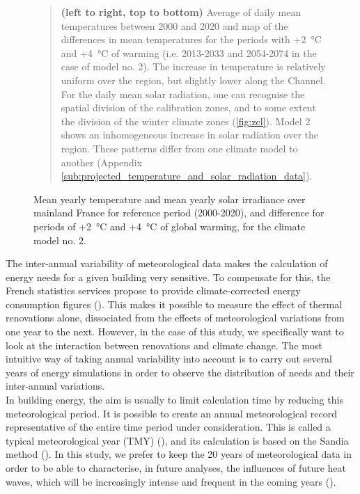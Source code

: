 \documentclass[11pt]{article}
\begin{document}
\begin{figure}[ht]
            \caption{\label{fig:map_temp_sun} Mean yearly temperature and mean yearly solar irradiance over mainland France for reference period (2000-2020), and difference for periods of +\SI{2}{\celsius} and +\SI{4}{\celsius} of global warming, for the climate model no. 2.}
            \begin{quote}
                \vspace{-2mm}
                \small\noindent
                \textbf{(left to right, top to bottom)} Average of daily mean temperatures between 2000 and 2020 and map of the differences in mean temperatures for the periods with +\SI{2}{\celsius} and +\SI{4}{\celsius} of warming (i.e. 2013-2033 and 2054-2074 in the case of model no. 2). The increase in temperature is relatively uniform over the region, but slightly lower along the Channel. For the daily mean solar radiation, one can recognise the spatial division of the calibration zones, and to some extent the division of the winter climate zones (\ref{fig:zcl}). Model 2 shows an inhomogeneous increase in solar radiation over the region. These patterns differ from one climate model to another (Appendix \ref{sub:projected_temperature_and_solar_radiation_data}). 
              \end{quote}
        \end{figure}

        The inter-annual variability of meteorological data makes the calculation of energy needs for a given building very sensitive. To compensate for this, the French statistics services propose to provide climate-corrected energy consumption figures (\cite{sdes_bilan_2023}). This makes it possible to measure the effect of thermal renovations alone, dissociated from the effects of meteorological variations from one year to the next. However, in the case of this study, we specifically want to look at the interaction between renovations and climate change. The most intuitive way of taking annual variability into account is to carry out several years of energy simulations in order to observe the distribution of needs and their inter-annual variations. \\

        In building energy, the aim is usually to limit calculation time by reducing this meteorological period. It is possible to create an annual meteorological record representative of the entire time period under consideration. This is called a typical meteorological year (TMY) (\cite{wilcox_users_2008}), and its calculation is based on the Sandia method (\cite{hall_generation_1978}). In this study, we prefer to keep the 20 years of meteorological data in order to be able to characterise, in future analyses, the influences of future heat waves, which will be increasingly intense and frequent in the coming years (\cite{ouzeau_heat_2016}).
\end{document}

